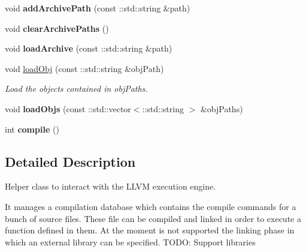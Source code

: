 \begin{DoxyCompactItemize}
\item 
\hypertarget{classbellerophon_1_1engine_1_1ExecutionEngineHelper_a741a12a635c41149af17fb291873ee73}{}\label{classbellerophon_1_1engine_1_1ExecutionEngineHelper_a741a12a635c41149af17fb291873ee73} 
void {\bfseries add\+Archive\+Path} (const \+::std\+::string \&path)
\item 
\hypertarget{classbellerophon_1_1engine_1_1ExecutionEngineHelper_ae6e8c69b6931c6a59e3baac42610f9d7}{}\label{classbellerophon_1_1engine_1_1ExecutionEngineHelper_ae6e8c69b6931c6a59e3baac42610f9d7} 
void {\bfseries clear\+Archive\+Paths} ()
\item 
\hypertarget{classbellerophon_1_1engine_1_1ExecutionEngineHelper_a002fdcd704a4b212aeba81b247f3740a}{}\label{classbellerophon_1_1engine_1_1ExecutionEngineHelper_a002fdcd704a4b212aeba81b247f3740a} 
void {\bfseries load\+Archive} (const \+::std\+::string \&path)
\item 
void \hyperlink{classbellerophon_1_1engine_1_1ExecutionEngineHelper_a6df2a721afdf41dab67487a9ac5ec9ba}{load\+Obj} (const \+::std\+::string \&obj\+Path)
\begin{DoxyCompactList}\small\item\em Load the objects contained in {\ttfamily obj\+Paths}. \end{DoxyCompactList}\item 
\hypertarget{classbellerophon_1_1engine_1_1ExecutionEngineHelper_a732a54bbac45e7df6e7afcf91bd7a8fd}{}\label{classbellerophon_1_1engine_1_1ExecutionEngineHelper_a732a54bbac45e7df6e7afcf91bd7a8fd} 
void {\bfseries load\+Objs} (const \+::std\+::vector$<$\+::std\+::string $>$ \&obj\+Paths)
\item 
\hypertarget{classbellerophon_1_1engine_1_1ExecutionEngineHelper_aad68e00a006a017fdfab64f7b8f8d366}{}\label{classbellerophon_1_1engine_1_1ExecutionEngineHelper_aad68e00a006a017fdfab64f7b8f8d366} 
int {\bfseries compile} ()
\end{DoxyCompactItemize}



\subsection{Detailed Description}
Helper class to interact with the L\+L\+VM execution engine. 

It manages a compilation database which contains the compile commands for a bunch of source files. These file can be compiled and linked in order to execute a function defined in them. At the moment is not supported the linking phase in which an external library can be specified. T\+O\+DO\+: Support libraries 

